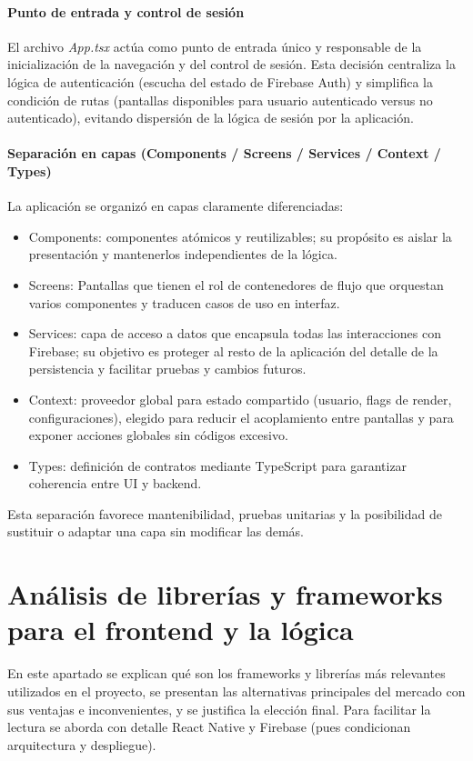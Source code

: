 \documentclass[twoside, openright, 11pt]{report}
\begin{document}
		\paragraph{Punto de entrada y control de sesión}
		El archivo \textit{App.tsx} actúa como punto de entrada único y responsable de la inicialización de la navegación y del control de sesión. Esta decisión centraliza la lógica de autenticación (escucha del estado de Firebase Auth) y simplifica la condición de rutas (pantallas disponibles para usuario autenticado versus no autenticado), evitando dispersión de la lógica de sesión por la aplicación.
		
		\paragraph{Separación en capas (Components / Screens / Services / Context / Types)}
		La aplicación se organizó en capas claramente diferenciadas:
		\begin{itemize}
			\item Components: componentes atómicos y reutilizables; su propósito es aislar la presentación y mantenerlos independientes de la lógica.
			\item Screens: Pantallas que tienen el rol de contenedores de flujo que orquestan varios componentes y traducen casos de uso en interfaz.
			\item Services: capa de acceso a datos que encapsula todas las interacciones con Firebase; su objetivo es proteger al resto de la aplicación del detalle de la persistencia y facilitar pruebas y cambios futuros.
			\item Context: proveedor global para estado compartido (usuario, flags de render, configuraciones), elegido para reducir el acoplamiento entre pantallas y para exponer acciones globales sin códigos excesivo.
			\item Types: definición de contratos mediante TypeScript para garantizar coherencia entre UI y backend.
		\end{itemize}
		Esta separación favorece mantenibilidad, pruebas unitarias y la posibilidad de sustituir o adaptar una capa sin modificar las demás.
	  
	\section{Análisis de librerías y frameworks para el frontend y la lógica}
	En este apartado se explican qué son los frameworks y librerías más relevantes utilizados en el proyecto, se presentan las alternativas principales del mercado con sus ventajas e inconvenientes, y se justifica la elección final. Para facilitar la lectura se aborda con detalle React Native y Firebase (pues condicionan arquitectura y despliegue).
	
\end{document}

